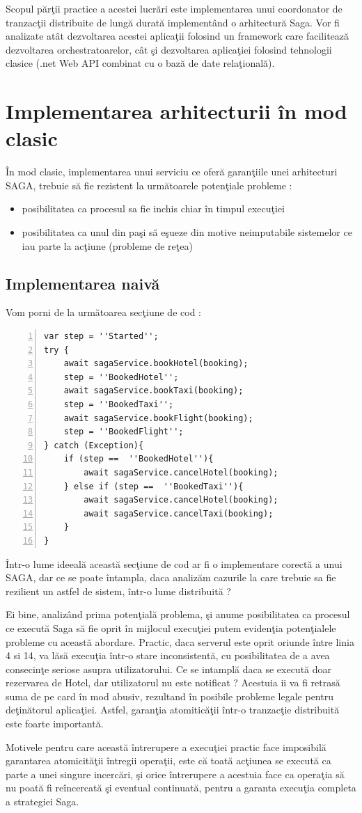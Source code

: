 \documentclass[a4paper,12pt]{report}
\begin{document}
\par Scopul părţii practice a acestei lucrări este implementarea unui coordonator de tranzacţii distribuite de lungă durată implementând o arhitectură Saga. Vor fi analizate atât dezvoltarea acestei aplicaţii folosind un framework care facilitează dezvoltarea orchestratoarelor, cât şi dezvoltarea aplicaţiei folosind tehnologii clasice (.net Web API  combinat cu o bază de date relaţională). 
\section{Implementarea arhitecturii în mod clasic}
\par În mod clasic, implementarea unui serviciu ce oferă garanţiile unei arhitecturi SAGA, trebuie să fie rezistent la următoarele potenţiale probleme :
\begin{itemize}
\item posibilitatea ca procesul sa fie inchis chiar în timpul execuţiei
\item posibilitatea ca unul din paşi să eşueze din motive neimputabile sistemelor ce iau parte la acţiune (probleme de reţea)
\end{itemize}
\subsection{Implementarea naivă}
Vom porni de la următoarea secţiune de cod : 
\begin{Verbatim}[numbers=left]
var step = ''Started'';
try {
	await sagaService.bookHotel(booking);
	step = ''BookedHotel'';
	await sagaService.bookTaxi(booking);
	step = ''BookedTaxi'';
	await sagaService.bookFlight(booking);
	step = ''BookedFlight'';
} catch (Exception){
	if (step ==  ''BookedHotel''){
		await sagaService.cancelHotel(booking);
	} else if (step ==  ''BookedTaxi''){
		await sagaService.cancelHotel(booking);
		await sagaService.cancelTaxi(booking);
	}
}
\end{Verbatim}
Într-o lume ideeală această secţiune de cod ar fi o implementare corectă a unui SAGA, dar ce se poate întampla, daca analizăm cazurile la care trebuie sa fie rezilient un astfel de sistem, într-o lume distribuită ? 
\par Ei bine, analizând prima potenţială problema, şi anume posibilitatea ca procesul ce execută Saga să fie oprit în mijlocul execuţiei putem evidenţia potenţialele probleme cu această abordare. Practic, daca serverul este oprit oriunde între linia 4 si 14, va lăsă execuţia într-o stare inconsistentă, cu posibilitatea de a avea consecinţe seriose asupra utilizatorului. Ce se intamplă daca se execută doar rezervarea de Hotel, dar utilizatorul nu este notificat ? Acestuia ii va fi retrasă suma de pe card în mod abusiv, rezultand în posibile probleme legale pentru deţinătorul aplicaţiei. Astfel, garanţia atomiticăţii într-o tranzacţie distribuită este foarte importantă. 
\par Motivele pentru care această întrerupere a execuţiei practic face imposibilă garantarea atomicităţii întregii operaţii, este că toată acţiunea se execută ca parte a unei singure incercări, şi orice întrerupere a acestuia face ca operaţia să nu poată fi reîncercată şi eventual continuată, pentru a garanta execuţia completa a strategiei Saga. 
\end{document}
